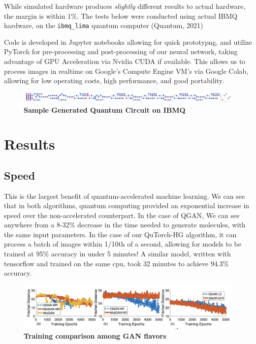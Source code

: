 \documentclass{scrartcl}
\makeatletter
\newcommand{\citeprocitem}[2]{\hyper@linkstart{cite}{citeproc_bib_item_#1}#2\hyper@linkend}
\makeatother
\begin{document}
While simulated hardware produces \emph{slightly} different results to actual hardware, the margin is within 1\%. The tests below were conducted using actual IBMQ hardware, on the \verb~ibmq_lima~ quantum computer (\citeprocitem{10}{Quantum, 2021})

Code is developed in Jupyter notebooks allowing for quick prototypng, and utilize PyTorch for pre-processing and post-processing of our neural network, taking advantage of GPU Acceleration via Nvidia CUDA if available. This allows us to process images in realtime on Google's Compute Engine VM's via Google Colab, allowing for low operating costs, high performance, and good portability.

\begin{figure}[htbp]
\centering
\includegraphics[width=.9\linewidth]{./assets/circuit.png}
\caption{\textbf{Sample Generated Quantum Circuit on IBMQ}}
\end{figure}

\section{Results}
\label{sec:orgf7b059b}

\subsection{Speed}
\label{sec:orgd3deb47}

This is the largest benefit of quantum-accelerated machine learning.  We can see that in both algorithms, quantum computing provided an exponential increase in speed over the non-accelerated counterpart. In the case of QGAN, We can see anywhere from a 8-32\% decrease in the time needed to generate molecules, with the same input parameters. In the case of our QuTorch-HG algorithm, it can process a batch of images within 1/10th of a second, allowing for models to be trained at 95\% accuracy in under 5 minutes! A similar model, written with tensorflow and trained on the same cpu, took 32 minutes to achieve 94.3\% accuracy.

\begin{figure}[htbp]
\centering
\includegraphics[width=.9\linewidth]{./assets/quganresults.png}
\caption{\textbf{Training comparison among GAN flavors}}
\end{figure}
\end{document}
